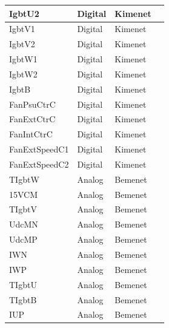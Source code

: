 \begin{table}[]
\begin{tabular}{|l|l|l|l|}
IgbtU2         & Digital      & Kimenet      &                                 \\ \hline
IgbtV1         & Digital      & Kimenet      &                                 \\ \hline
IgbtV2         & Digital      & Kimenet      &                                 \\ \hline
IgbtW1         & Digital      & Kimenet      &                                 \\ \hline
IgbtW2         & Digital      & Kimenet      &                                 \\ \hline
IgbtB          & Digital      & Kimenet      &                                 \\ \hline
FanPsuCtrC     & Digital      & Kimenet      &                                 \\ \hline
FanExtCtrC     & Digital      & Kimenet      &                                 \\ \hline
FanIntCtrC     & Digital      & Kimenet      &                                 \\ \hline
FanExtSpeedC1  & Digital      & Kimenet      &                                 \\ \hline
FanExtSpeedC2  & Digital      & Kimenet      &                                 \\ \hline
TIgbtW         & Analog       & Bemenet      &                                 \\ \hline
15VCM          & Analog       & Bemenet      &                                 \\ \hline
TIgbtV         & Analog       & Bemenet      &                                 \\ \hline
UdcMN          & Analog       & Bemenet      &                                 \\ \hline
UdcMP          & Analog       & Bemenet      &                                 \\ \hline
IWN            & Analog       & Bemenet      &                                 \\ \hline
IWP            & Analog       & Bemenet      &                                 \\ \hline
TIgbtU         & Analog       & Bemenet      &                                 \\ \hline
TIgbtB         & Analog       & Bemenet      &                                 \\ \hline
IUP            & Analog       & Bemenet      &                                 \\ \hline

\end{tabular}
\end{table}

